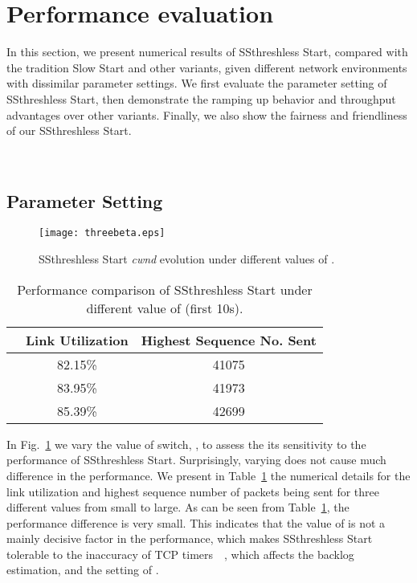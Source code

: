 \documentclass[12pt,onecolumn]{IEEEtran}
\begin{document}
\section{Performance evaluation}

In this section, we present numerical results of SSthreshless Start, compared
with the tradition Slow Start and other variants, given different network
environments with dissimilar parameter settings. We first evaluate the parameter
setting of SSthreshless Start, then demonstrate the ramping up behavior and
throughput advantages over other variants. Finally, we also show the fairness
and friendliness of our SSthreshless Start.

~\subsection{Parameter Setting}

\begin{figure}
\centering
\texttt{[image: threebeta.eps]}
\caption{SSthreshless Start \emph{cwnd} evolution under different values of
.} \label{fig_Parameter}
\end{figure}

\begin{table}
\centering
\caption{\footnotesize Performance comparison of SSthreshless Start under different value of   (first 10s).} \begin{tabular}{|c|c|c|} \hline
 & Link Utilization & Highest Sequence No. Sent \\ \hline \hline
 & 82.15\% & 41075 \\ \hline  & 83.95\% & 41973   \\ \hline
 & 85.39\% & 42699  \\ \hline
\end{tabular}
\label{tableparameter}
\end{table}




In Fig.~\ref{fig_Parameter} we vary the value of switch, , to assess the
its sensitivity to the performance of SSthreshless Start. Surprisingly, varying
 does not cause much difference in the performance. We present in
Table~\ref{tableparameter} the numerical details for the link utilization and
highest sequence number of packets being sent for three different 
values from small to large. As can be seen from Table~\ref{tableparameter}, the
performance difference is very small. This indicates that the value of 
is not a mainly decisive factor in the performance, which makes SSthreshless
Start tolerable to the inaccuracy of TCP
timers~\cite{timer1}~\cite{timer2}, which affects the backlog
estimation, and the setting of .
\end{document}
